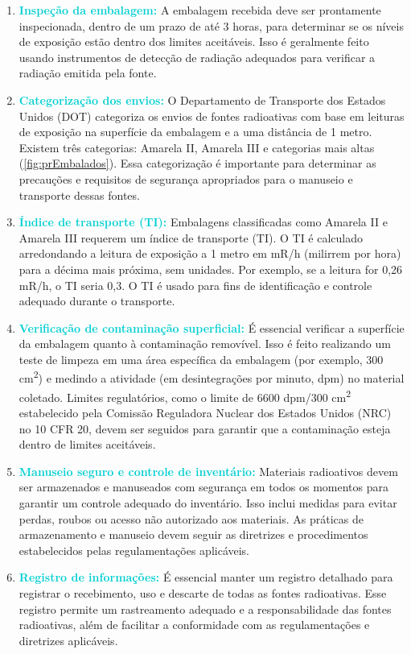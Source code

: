 \documentclass[11pt,a4paper]{article}
\newcounter{exemplo}
\begin{document}
	\begin{enumerate}[label=\textcolor{CarnationPink}{\arabic*.}]
		\item \textcolor{DarkTurquoise}{\textbf{Inspeção da embalagem:}} A embalagem recebida deve ser prontamente inspecionada, dentro de um prazo de até 3 horas, para determinar se os níveis de exposição estão dentro dos limites aceitáveis. Isso é geralmente feito usando instrumentos de detecção de radiação adequados para verificar a radiação emitida pela fonte.
		
		\item \textcolor{DarkTurquoise}{\textbf{Categorização dos envios:}} O Departamento de Transporte dos Estados Unidos (DOT) categoriza os envios de fontes radioativas com base em leituras de exposição na superfície da embalagem e a uma distância de 1 metro. Existem três categorias: Amarela II, Amarela III e categorias mais altas (\ref{fig:prEmbalados}). Essa categorização é importante para determinar as precauções e requisitos de segurança apropriados para o manuseio e transporte dessas fontes.
		
		\item \textcolor{DarkTurquoise}{\textbf{Índice de transporte (TI):}} Embalagens classificadas como Amarela II e Amarela III requerem um índice de transporte (TI). O TI é calculado arredondando a leitura de exposição a 1 metro em mR/h (milirrem por hora) para a décima mais próxima, sem unidades. Por exemplo, se a leitura for 0,26 mR/h, o TI seria 0,3. O TI é usado para fins de identificação e controle adequado durante o transporte.
		
		\item \textcolor{DarkTurquoise}{\textbf{Verificação de contaminação superficial:}} É essencial verificar a superfície da embalagem quanto à contaminação removível. Isso é feito realizando um teste de limpeza em uma área específica da embalagem (por exemplo, 300 cm\textsuperscript{2}) e medindo a atividade (em desintegrações por minuto, dpm) no material coletado. Limites regulatórios, como o limite de 6600 dpm/300 cm\textsuperscript{2} estabelecido pela Comissão Reguladora Nuclear dos Estados Unidos (NRC) no 10 CFR 20, devem ser seguidos para garantir que a contaminação esteja dentro de limites aceitáveis.
		
		\item \textcolor{DarkTurquoise}{\textbf{Manuseio seguro e controle de inventário:}} Materiais radioativos devem ser armazenados e manuseados com segurança em todos os momentos para garantir um controle adequado do inventário. Isso inclui medidas para evitar perdas, roubos ou acesso não autorizado aos materiais. As práticas de armazenamento e manuseio devem seguir as diretrizes e procedimentos estabelecidos pelas regulamentações aplicáveis.
		
		\item \textcolor{DarkTurquoise}{\textbf{Registro de informações:}} É essencial manter um registro detalhado para registrar o recebimento, uso e descarte de todas as fontes radioativas. Esse registro permite um rastreamento adequado e a responsabilidade das fontes radioativas, além de facilitar a conformidade com as regulamentações e diretrizes aplicáveis.
	\end{enumerate}
\end{document}

